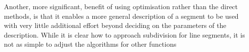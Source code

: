 Another, more significant, benefit of using optimisation rather than the direct methods, is that it enables a more general description of a segment to be used with very little additional effort beyond deciding on the parameters of the description.
While it is clear how to approach subdivision for line segments, it is not as simple to adjust the algorithms for other functions~\citep{waibel.lee1990readings}

